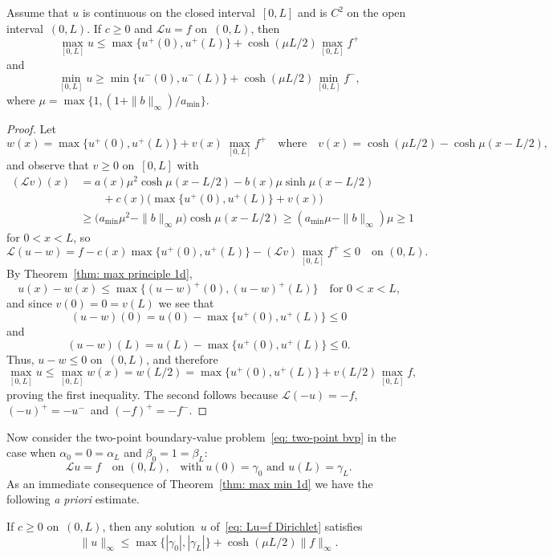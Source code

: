 \begin{theorem}\label{thm: max min 1d}
Assume that $u$ is continuous on the closed interval~$[0,L]$ and is $C^2$ on 
the open interval~$(0,L)$. If $c\ge0$ and $\mathcal{L}u=f$ on~$(0,L)$, then
\[
\max_{[0,L]}u\le\max\{u^+(0),u^+(L)\}+\cosh(\mu L/2)\max_{[0,L]}f^+
\]
and
\[
\min_{[0,L]}u\ge\min\{u^-(0),u^-(L)\}+\cosh(\mu L/2)\min_{[0,L]}f^-,
\]
where $\mu=\max\bigl\{1,(1+\|b\|_\infty)/a_{\min}\bigr\}$.
\end{theorem}
\begin{proof}
Let
\[
w(x)=\max\{u^+(0),u^+(L)\}+v(x)\,\max_{[0,L]}f^+
\quad\text{where}\quad
v(x)=\cosh(\mu L/2)-\cosh\mu(x-L/2),
\]
and observe that $v\ge0$ on~$[0,L]$ with
\begin{align*}
(\mathcal{L}v)(x)&=a(x)\mu^2\cosh\mu(x-L/2)
	-b(x)\mu\sinh\mu(x-L/2)\\
	&\qquad{}+c(x)\bigl(\max\{u^+(0),u^+(L)\}+v(x)\big)\\
	&\ge\bigl(a_{\min}\mu^2-\|b\|_\infty\mu\bigr)\cosh\mu(x-L/2)
	\ge(a_{\min}\mu-\|b\|_\infty)\mu\ge1
\end{align*}
for $0<x<L$, so
\[
\mathcal{L}(u-w)=f-c(x)\max\{u^+(0),u^+(L)\}-(\mathcal{L}v)\max_{[0,L]}f^+
	\le0\quad\text{on $(0,L)$.}
\]
By Theorem~\ref{thm: max principle 1d},
\[
u(x)-w(x)\le\max\{(u-w)^+(0),(u-w)^+(L)\}\quad\text{for $0<x<L$,}
\]
and since $v(0)=0=v(L)$ we see that 
\[
(u-w)(0)=u(0)-\max\{u^+(0),u^+(L)\}\le0
\]
and
\[
(u-w)(L)=u(L)-\max\{u^+(0),u^+(L)\}\le0.
\]
Thus, $u-w\le0$ on~$(0,L)$, and therefore 
\[
\max_{[0,L]}u\le\max_{[0,L]}w(x)=w(L/2)=\max\{u^+(0),u^+(L)\}
	+v(L/2)\max_{[0,L]}f, 
\]
proving the first inequality.  
The second follows because $\mathcal{L}(-u)=-f$, $(-u)^+=-u^-$~and
$(-f)^+=-f^-$.
\end{proof}

Now consider the two-point boundary-value problem~\eqref{eq: two-point bvp} in 
the case when $\alpha_0=0=\alpha_L$ and $\beta_0=1=\beta_L$:
\begin{equation}\label{eq: Lu=f Dirichlet}
\mathcal{L}u=f\quad\text{on $(0,L)$,}
	\quad\text{with $u(0)=\gamma_0$ and $u(L)=\gamma_L$.}
\end{equation}
As an immediate consequence of Theorem~\ref{thm: max min 1d} we have the 
following \emph{a priori} estimate.

\begin{theorem}\label{thm: Lu=f apriori infty}
If $c\ge0$ on~$(0,L)$, then any solution~$u$ of~\eqref{eq: Lu=f Dirichlet} 
satisfies
\[
\|u\|_\infty\le\max\{|\gamma_0|,|\gamma_L|\}+\cosh(\mu L/2)\|f\|_\infty.
\]
\end{theorem}

